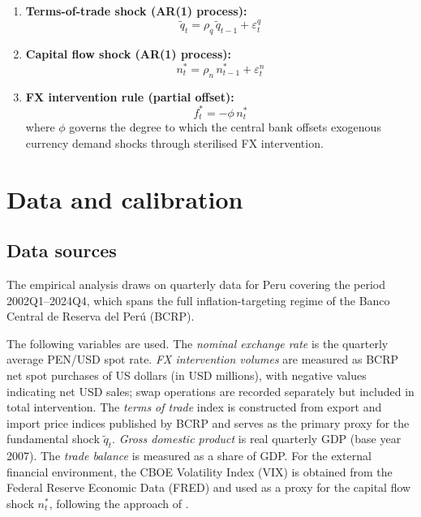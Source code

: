 \documentclass[12pt,a4paper]{article}
\begin{document}
\begin{enumerate}
    \item \textbf{Terms-of-trade shock (AR(1) process):}
    \begin{equation}
        \tilde{q}_t = \rho_q\, \tilde{q}_{t-1} + \varepsilon^q_t
        \label{eq:qtilde}
    \end{equation}

    \item \textbf{Capital flow shock (AR(1) process):}
    \begin{equation}
        n^*_t = \rho_n\, n^*_{t-1} + \varepsilon^n_t
        \label{eq:nstar}
    \end{equation}

    \item \textbf{FX intervention rule (partial offset):}
    \begin{equation}
        f^*_t = -\phi\, n^*_t
        \label{eq:fxi}
    \end{equation}
    where $\phi$ governs the degree to which the central bank
    offsets exogenous currency demand shocks through sterilised FX intervention.

\end{enumerate}

\section{Data and calibration}

\subsection{Data sources}

The empirical analysis draws on quarterly data for Peru covering the period 2002Q1--2024Q4, which spans the full inflation-targeting regime of the Banco Central de Reserva del Per\'u (BCRP). %

The following variables are used. The \textit{nominal exchange rate} is the quarterly average PEN/USD spot rate. \textit{FX intervention volumes} are measured as BCRP net spot purchases of US dollars (in USD millions), with negative values indicating net USD sales; swap operations are recorded separately but included in total intervention. The \textit{terms of trade} index is constructed from export and import price indices published by BCRP and serves as the primary proxy for the fundamental shock $\tilde{q}_t$. \textit{Gross domestic product} is real quarterly GDP (base year 2007). The \textit{trade balance} is measured as a share of GDP. For the external financial environment, the CBOE Volatility Index (VIX) is obtained from the Federal Reserve Economic Data (FRED) and used as a proxy for the capital flow shock $n^*_t$, following the approach of \cite{MONTORO2023102825}.
\end{document}
